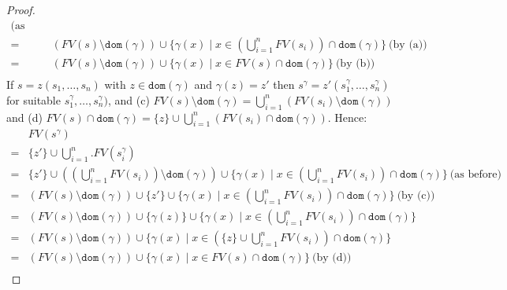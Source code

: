 \documentclass{lmcs}
\theoremstyle{theorem}\newtheorem{theorem}[dummy]{Theorem}
\theoremstyle{theorem}\newtheorem{lemma}[dummy]{Lemma}
\theoremstyle{theorem}\newtheorem{corollary}[dummy]{Corollary}
\theoremstyle{definition}\newtheorem{definition}[dummy]{Definition}
\theoremstyle{definition}\newtheorem{example}[dummy]{Example}
\newcommand{\FV}{\mathit{FV}}
\newcommand{\domain}{\mathtt{dom}}
\begin{document}
\begin{proof}
\[\begin{array}{cl}
  \text{(as above)} \\
= & (\FV(s) \setminus \domain(\gamma)) \cup \{ \gamma(x) \mid x \in (\bigcup_{i=1}^n \FV(s_i)) \cap \domain(\gamma) \}\ 
  \text{(by (a))} \\
= & (\FV(s) \setminus \domain(\gamma)) \cup \{ \gamma(x) \mid x \in \FV(s) \cap \domain(\gamma) \}\ 
  \text{(by (b))} \\
\end{array}
\]
If $s = z(s_1,\dots,s_n)$ with $z \in \domain(\gamma)$ and $\gamma(z) = z'$ then $s^\gamma =
z'(s_1^\gamma,\dots,s_n^\gamma)$ for suitable $s_1^\gamma,\dots,s_n^\gamma)$, and
(c) $\FV(s) \setminus \domain(\gamma) = \bigcup_{i=1}^n (\FV(s_i) \setminus \domain(\gamma))$
and (d) $\FV(s) \cap \domain(\gamma) = \{ z \} \cup \bigcup_{i=1}^n (\FV(s_i) \cap
\domain(\gamma))$.  Hence:
\[
\begin{array}{cl}
& \FV(s^\gamma) \\
= & \{ z' \} \cup \bigcup_{i=1}^n. \FV(s_i^\gamma) \\
= & \{ z' \} \cup ((\bigcup_{i=1}^n \FV(s_i)) \setminus \domain(\gamma)) \cup
  \{ \gamma(x) \mid x \in (\bigcup_{i=1}^n \FV(s_i)) \cap \domain(\gamma) \}\ 
  \text{(as before)} \\
= & (\FV(s) \setminus \domain(\gamma)) \cup \{ z' \} \cup \{ \gamma(x) \mid x \in (\bigcup_{i=1}^n \FV(s_i)) \cap \domain(\gamma) \}\ 
  \text{(by (c))} \\
= & (\FV(s) \setminus \domain(\gamma)) \cup \{ \gamma(z) \} \cup \{ \gamma(x) \mid x \in (\bigcup_{i=1}^n \FV(s_i)) \cap \domain(\gamma) \} \\
= & (\FV(s) \setminus \domain(\gamma)) \cup \{ \gamma(x) \mid x \in (\{ z \} \cup \bigcup_{i=1}^n \FV(s_i)) \cap \domain(\gamma) \} \\
= & (\FV(s) \setminus \domain(\gamma)) \cup \{ \gamma(x) \mid x \in \FV(s) \cap \domain(\gamma) \}\ \text{(by (d))} \\
\end{array}
\]


\end{proof}
\end{document}
